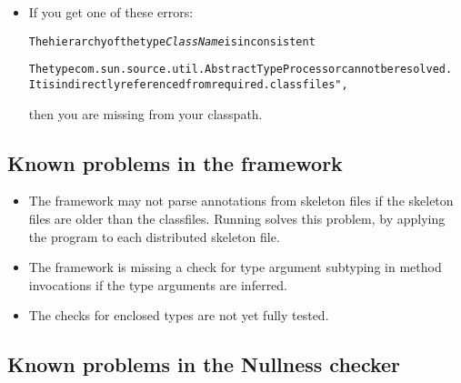 \begin{itemize}
\item
If you get one of these errors:

\begin{alltt}
The hierarchy of the type \emph{ClassName} is inconsistent

The type com.sun.source.util.AbstractTypeProcessor cannot be resolved.
  It is indirectly referenced from required .class files", 
\end{alltt}

\noindent
then you are missing  from your classpath.

\end{itemize}


\subsection{Known problems in the framework\label{known-problems}}

\begin{itemize}

\item
  The framework may not parse annotations from skeleton files if the
  skeleton files are older than the classfiles.  Running  solves this problem, by applying the 
   program to each distributed skeleton file.

\item The framework is missing a check for type argument subtyping in
  method invocations if the type arguments are inferred.

\item The checks for enclosed types are not yet fully tested.

\end{itemize}

\subsection{Known problems in the Nullness checker}


